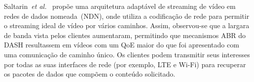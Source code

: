
Saltarin~\textit{et al.}~\cite{saltarinTrans2017} propõe uma arquitetura adaptável de streaming de vídeo em redes de dados nomeada~(NDN), onde utiliza a codificação de rede para permitir o streaming ideal de vídeo por vários caminhos. Assim, observou-se que a largara de banda vista pelos clientes aumentaram,
permitindo que mecanismos ABR do DASH resultassem em vídeos com um QoE maior do que foi apresentado com uma comunicação de caminho único.
Os clientes podem transmitir seus interesses por todas as suas interfaces de rede (por exemplo, LTE e Wi-Fi) para recuperar os pacotes de dados que compõem o conteúdo solicitado.

